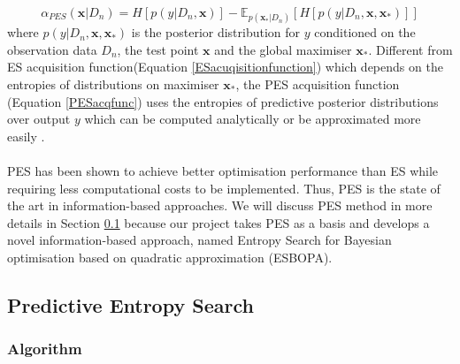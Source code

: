 \documentclass[a4paper,11pt]{report}
\begin{document}
\begin{equation} \label{PESacqfunc}
\alpha_{PES} (\mathbf{x} \vert D_n )=H[p(y \vert D_n,\mathbf{x})]-\mathbb{E} _{p(\mathbf{x}_{*} \vert D_n)}[H[p(y \vert D_n,\mathbf{x},\mathbf{x}_{*})]]
\end{equation}
where $p(y \vert D_n,\mathbf{x},\mathbf{x}_{*})$ is the posterior distribution for $y$ conditioned on the observation data $D_n$, the test point $\mathbf{x}$ and the global maximiser $\mathbf{x}_{*}$. Different from ES acquisition function(Equation \ref{ESacuqisitionfunction}) which depends on the entropies of distributions on maximiser $\mathbf{x}_{*}$, the PES acquisition function (Equation \ref{PESacqfunc}) uses the entropies of predictive posterior distributions over output $y$ which can be computed analytically or be approximated more easily \cite{hernandez2014predictive}.
\\\\
PES has been shown to achieve better optimisation performance than ES  while requiring  less computational costs to be implemented. Thus, PES is the state of the art in information-based approaches. We will discuss PES method in more details in Section \ref{PESsection} because our project takes PES as a basis and develops a novel information-based approach, named Entropy Search for Bayesian optimisation based on quadratic approximation (ESBOPA).

\subsection{Predictive Entropy Search} \label{PESsection}
\subsubsection{Algorithm} \label{PESderivation}
\end{document}
